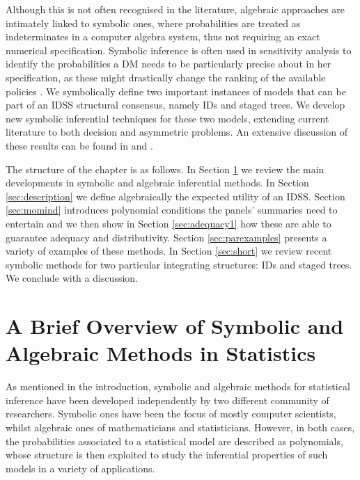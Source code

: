 Although this is not often recognised in the literature, algebraic approaches are intimately linked to symbolic ones, where probabilities are treated as indeterminates in a computer algebra system, thus not requiring an exact numerical specification. Symbolic inference is often used in sensitivity analysis to identify the probabilities a DM needs to be particularly precise about in her specification, as these might drastically change the ranking of the available policies \citep{French2003}. We symbolically define two important instances of models that can be part of an IDSS structural consensus, namely IDs and staged trees. We develop new symbolic inferential techniques for these two models, extending  current literature to both decision and asymmetric problems. An extensive discussion of these results can be found in \citet{Leonelli2015a} and \citet{Gorgen2015}. 

 The structure of the chapter is as follows. In Section \ref{sec:history} we  review the main developments in symbolic and algebraic inferential methods. In Section \ref{sec:description} we  define algebraically the  expected utility of an  IDSS. Section \ref{sec:momind} introduces polynomial conditions the panels' summaries need to entertain and we then show in Section \ref{sec:adequacy1} how these are able to guarantee adequacy and distributivity. Section \ref{sec:parexamples} presents a variety of examples of these methods. In Section \ref{sec:short} we review recent symbolic methods for two particular integrating structures: IDs and staged trees. We conclude with a discussion.
 
\section{A Brief Overview of Symbolic and Algebraic Methods in Statistics}
\label{sec:history}
As mentioned in the introduction, symbolic and algebraic methods for statistical inference have been developed independently by two different community of researchers. Symbolic ones have been the focus of mostly computer scientists, whilst algebraic ones of mathematicians and statisticians. However, in both cases, the probabilities associated to a statistical model are described as polynomials, whose structure is then exploited to study the inferential properties of such models in a variety of applications. 

